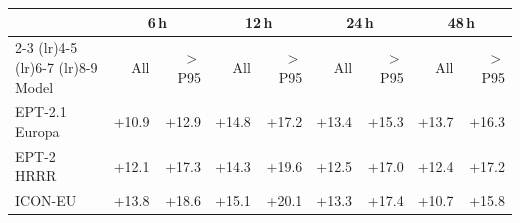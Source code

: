 \begin{tabular}{@{}l*{8}{r}@{}}
\toprule
& \multicolumn{2}{c}{6\,h} & \multicolumn{2}{c}{12\,h} & \multicolumn{2}{c}{24\,h} & \multicolumn{2}{c}{48\,h} \\
\cmidrule(lr){2-3} \cmidrule(lr){4-5} \cmidrule(lr){6-7} \cmidrule(lr){8-9}
Model & All & $>$P95 & All & $>$P95 & All & $>$P95 & All & $>$P95 \\
\midrule
EPT-2.1 Europa & +10.9 & +12.9 & +14.8 & +17.2 & +13.4 & +15.3 & +13.7 & +16.3 \\\addlinespace[0.3em]
EPT-2 HRRR & +12.1 & +17.3 & +14.3 & +19.6 & +12.5 & +17.0 & +12.4 & +17.2 \\\addlinespace[0.3em]
ICON-EU & +13.8 & +18.6 & +15.1 & +20.1 & +13.3 & +17.4 & +10.7 & +15.8 \\
\bottomrule
\end{tabular}

